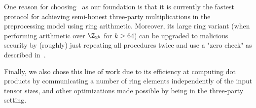 
One reason for choosing~\cite{CCS:AFLNO16} as our foundation is that it is currently the fastest protocol for achieving semi-honest three-party multiplications in the preprocessing model using ring arithmetic.
%
Moreover, its large ring variant (when performing arithmetic over $\Z_{2^k}$ for $k \geq 64$) can be upgraded to malicious security by (roughly) just repeating all procedures twice and use a "zero check" as described in~\cite{cryptoeprint:2020:1330}.

Finally, we also chose this line of work due to its efficiency at computing dot products by communicating a number of ring elements independently of the input tensor sizes, and other optimizations made possible by being in the three-party setting.


